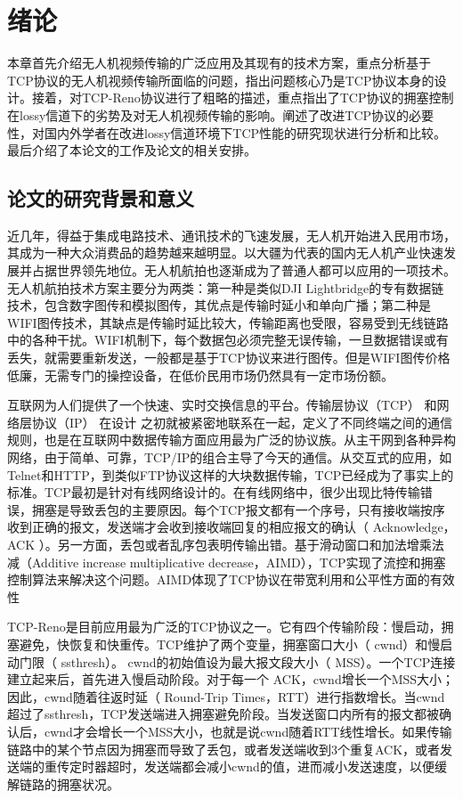 
\chapter{绪论}
\par
本章首先介绍无人机视频传输的广泛应用及其现有的技术方案，重点分析基于TCP协议的无人机视频传输所面临的问题，指出问题核心乃是TCP协议本身的设计。接着，对TCP-Reno协议进行了粗略的描述，重点指出了TCP协议的拥塞控制在lossy信道下的劣势及对无人机视频传输的影响。阐述了改进TCP协议的必要性，对国内外学者在改进lossy信道环境下TCP性能的研究现状进行分析和比较。最后介绍了本论文的工作及论文的相关安排。
\section{论文的研究背景和意义}
\par
近几年，得益于集成电路技术、通讯技术的飞速发展，无人机开始进入民用市场，其成为一种大众消费品的趋势越来越明显。以大疆为代表的国内无人机产业快速发展并占据世界领先地位。无人机航拍也逐渐成为了普通人都可以应用的一项技术。无人机航拍技术方案主要分为两类：第一种是类似DJI Lightbridge的专有数据链技术，包含数字图传和模拟图传，其优点是传输时延小和单向广播；第二种是WIFI图传技术，其缺点是传输时延比较大，传输距离也受限，容易受到无线链路中的各种干扰。WIFI机制下，每个数据包必须完整无误传输，一旦数据错误或有丢失，就需要重新发送，一般都是基于TCP协议来进行图传。但是WIFI图传价格低廉，无需专门的操控设备，在低价民用市场仍然具有一定市场份额。
\par
互联网为人们提供了一个快速、实时交换信息的平台。传输层协议（TCP） 和网络层协议（IP） 在设计
之初就被紧密地联系在一起，定义了不同终端之间的通信规则，也是在互联网中数据传输方面应用最为广泛的协议族。从主干网到各种异构网络，由于简单、可靠，TCP/IP的组合主导了今天的通信。从交互式的应用，如Telnet和HTTP，到类似FTP协议这样的大块数据传输，TCP已经成为了事实上的标准。TCP最初是针对有线网络设计的。在有线网络中，很少出现比特传输错误，拥塞是导致丢包的主要原因。每个TCP报文都有一个序号，只有接收端按序收到正确的报文，发送端才会收到接收端回复的相应报文的确认（ Acknowledge，ACK ）。另一方面，丢包或者乱序包表明传输出错。基于滑动窗口和加法增乘法减（Additive  increase multiplicative decrease，AIMD）\cite{Chiu1989Analysis}，TCP实现了流控和拥塞控制算法来解决这个问题。AIMD体现了TCP协议在带宽利用和公平性方面的有效性
\par
TCP-Reno是目前应用最为广泛的TCP协议之一。它有四个传输阶段：慢启动，拥塞避免，快恢复和快重传。TCP维护了两个变量，拥塞窗口大小（ cwnd）和慢启动门限（ ssthresh）。 cwnd的初始值设为最大报文段大小（ MSS）。一个TCP连接建立起来后，首先进入慢启动阶段。对于每一个
ACK，cwnd增长一个MSS大小；因此，cwnd随着往返时延（ Round-Trip Times，RTT）进行指数增长。当cwnd超过了ssthresh，TCP发送端进入拥塞避免阶段。当发送窗口内所有的报文都被确认后，cwnd才会增长一个MSS大小，也就是说cwnd随着RTT线性增长。如果传输链路中的某个节点因为拥塞而导致了丢包，或者发送端收到3个重复ACK，或者发送端的重传定时器超时，发送端都会减小cwnd的值，进而减小发送速度，以便缓解链路的拥塞状况。

